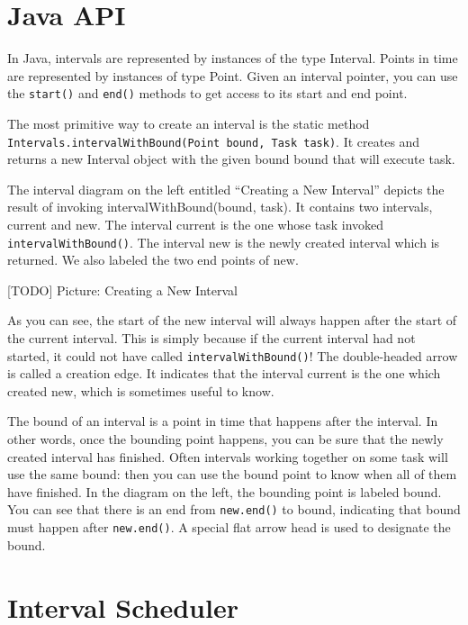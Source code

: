 \section{Java API}
\label{sec:intervals-java-api}

In Java, intervals are represented by instances of the type Interval.
Points in time are represented by instances of type Point. Given an
interval pointer, you can use the \lstinline|start()| and
\lstinline|end()| methods to get access to its start and end point.

The most primitive way to create an interval is the static method
\\\lstinline|Intervals.intervalWithBound(Point bound, Task task)|. It
creates and returns a new Interval object with the given bound bound
that will execute task.

The interval diagram on the left entitled ``Creating a New Interval''
depicts the result of invoking intervalWithBound(bound, task). It
contains two intervals, current and new. The interval current is the
one whose task invoked \lstinline|intervalWithBound()|. The interval
new is the newly created interval which is returned. We also labeled
the two end points of new.

[TODO] Picture: Creating a New Interval

As you can see, the start of the new interval will always happen after
the start of the current interval. This is simply because if the
current interval had not started, it could not have called
\lstinline|intervalWithBound()|! The double-headed arrow is called a
creation edge. It indicates that the interval current is the one which
created new, which is sometimes useful to know.

The bound of an interval is a point in time that happens after the
interval. In other words, once the bounding point happens, you can be
sure that the newly created interval has finished. Often intervals
working together on some task will use the same bound: then you can
use the bound point to know when all of them have finished. In the
diagram on the left, the bounding point is labeled bound. You can see
that there is an end from \lstinline|new.end()| to bound, indicating
that bound must happen after \lstinline|new.end()|. A special flat
arrow head is used to designate the bound.

\section{Interval Scheduler}
\label{sec:intervals-interval-scheduler}

